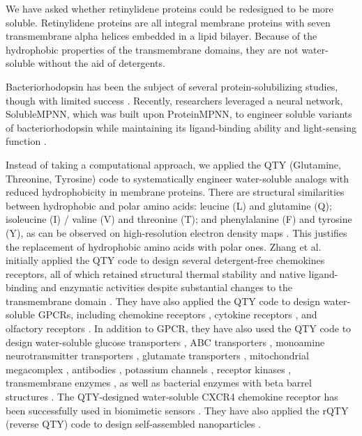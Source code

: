 \documentclass[fleqn, 10pt]{manuscript}
\begin{document}
We have asked whether retinylidene proteins could be redesigned to be more soluble. Retinylidene proteins are all integral membrane proteins with seven transmembrane alpha helices embedded in a lipid bilayer. Because of the hydrophobic properties of the transmembrane domains, they are not water-soluble without the aid of detergents. 

Bacteriorhodopsin has been the subject of several protein-solubilizing studies, though with limited success \citep{Qing_2022}. Recently, researchers leveraged a neural network, SolubleMPNN, which was built upon ProteinMPNN, to engineer soluble variants of bacteriorhodopsin while maintaining its ligand-binding ability and light-sensing function \citep{Nikolaev_2024}.

Instead of taking a computational approach, we applied the QTY (Glutamine, Threonine, Tyrosine) code to systematically engineer water-soluble analogs with reduced hydrophobicity in membrane proteins. There are structural similarities between hydrophobic and polar amino acids: leucine (L) and glutamine (Q); isoleucine (I) / valine (V) and threonine (T); and phenylalanine (F) and tyrosine (Y), as can be observed on high-resolution electron density maps \citep{Zhang_2018, Zhang_2022, Tegler_2020}. This justifies the replacement of hydrophobic amino acids with polar ones. Zhang et al. initially applied the QTY code to design several detergent-free chemokines receptors, all of which retained structural thermal stability and native ligand-binding and enzymatic activities despite substantial changes to the transmembrane domain \citep{Zhang_2018, Tegler_2020}. They have also applied the QTY code to design water-soluble GPCRs, including chemokine receptors \citep{Zhang_2018, Qing_2019, Tegler_2020, Skuhersky_2021}, cytokine receptors \citep{Hao_2020}, and olfactory receptors \citep{Skuhersky_2021, Johnsson_2025}. In addition to GPCR, they have also used the QTY code to design water-soluble glucose transporters \citep{Smorodina_2022}, ABC transporters \citep{Pan_2024}, monoamine neurotransmitter transporters \citep{Karagol_Karagol_Alper_2024}, glutamate transporters \citep{Karagol_Karagol_Smorodina_2024, Karagol_2024}, mitochondrial megacomplex \citep{Chen_2025}, antibodies \citep{Li_Wang_2024}, potassium channels \citep{Smorodina_2024}, receptor kinases \citep{Li_Tang_2024}, transmembrane enzymes \citep{Chen_Pan_2025}, as well as bacterial enzymes with beta barrel structures \citep{Sajeev-Sheeja_2023, Sajeev-Sheeja_2024}. The QTY-designed water-soluble CXCR4 chemokine receptor has been successfully used in biomimetic sensors \citep{Qing_2023}. They have also applied the rQTY (reverse QTY) code to design self-assembled nanoparticles \citep{Meng_2023}.
\end{document}
